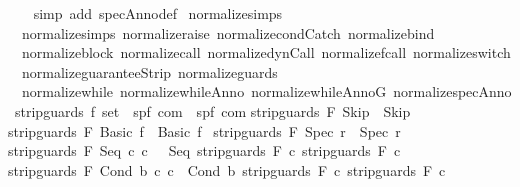 \begin{isabellebody}
%
\isadelimproof
\ \ %
\endisadelimproof
%
\isatagproof
{}\isamarkupfalse%
\ {\isacharparenleft}simp\ add{\isacharcolon}\ specAnno{\isacharunderscore}def{\isacharparenright}%
\endisatagproof
{\isafoldproof}%
%
\isadelimproof
\isanewline
%
\endisadelimproof
\isanewline
{}\isamarkupfalse%
\ normalize{\isacharunderscore}simps\ {\isacharequal}\ \isanewline
\ \ normalize{\isachardot}simps\ normalize{\isacharunderscore}raise\ normalize{\isacharunderscore}condCatch\ normalize{\isacharunderscore}bind\isanewline
\ \ normalize{\isacharunderscore}block\ normalize{\isacharunderscore}call\ normalize{\isacharunderscore}dynCall\ normalize{\isacharunderscore}fcall\ normalize{\isacharunderscore}switch\isanewline
\ \ normalize{\isacharunderscore}guaranteeStrip\ normalize{\isacharunderscore}guards\ \isanewline
\ \ normalize{\isacharunderscore}while\ normalize{\isacharunderscore}whileAnno\ normalize{\isacharunderscore}whileAnnoG\ normalize{\isacharunderscore}specAnno%
\isamarkuptrue%
\isamarkupfalse%
\ strip{\isacharunderscore}guards{\isacharcolon}{\isacharcolon}\ {\isachardoublequoteopen}{\isacharprime}f\ set\ {\isasymRightarrow}\ {\isacharparenleft}{\isacharprime}s{\isacharcomma}{\isacharprime}p{\isacharcomma}{\isacharprime}f{\isacharparenright}\ com\ {\isasymRightarrow}\ {\isacharparenleft}{\isacharprime}s{\isacharcomma}{\isacharprime}p{\isacharcomma}{\isacharprime}f{\isacharparenright}\ com{\isachardoublequoteclose}\isanewline
{}\isanewline
{\isachardoublequoteopen}strip{\isacharunderscore}guards\ F\ Skip\ {\isacharequal}\ Skip{\isachardoublequoteclose}\ {\isacharbar}\isanewline
{\isachardoublequoteopen}strip{\isacharunderscore}guards\ F\ {\isacharparenleft}Basic\ f{\isacharparenright}\ {\isacharequal}\ Basic\ f{\isachardoublequoteclose}\ {\isacharbar}\isanewline
{\isachardoublequoteopen}strip{\isacharunderscore}guards\ F\ {\isacharparenleft}Spec\ r{\isacharparenright}\ {\isacharequal}\ Spec\ r{\isachardoublequoteclose}\ {\isacharbar}\isanewline
{\isachardoublequoteopen}strip{\isacharunderscore}guards\ F\ {\isacharparenleft}Seq\ c\ c\ \ {\isacharequal}\ {\isacharparenleft}Seq\ {\isacharparenleft}strip{\isacharunderscore}guards\ F\ c\ {\isacharparenleft}strip{\isacharunderscore}guards\ F\ c\ {\isacharbar}\isanewline
{\isachardoublequoteopen}strip{\isacharunderscore}guards\ F\ {\isacharparenleft}Cond\ b\ c\ c\ {\isacharequal}\ Cond\ b\ {\isacharparenleft}strip{\isacharunderscore}guards\ F\ c\ {\isacharparenleft}strip{\isacharunderscore}guards\ F\ c\ {\isacharbar}\isanewline

\end{isabellebody}
